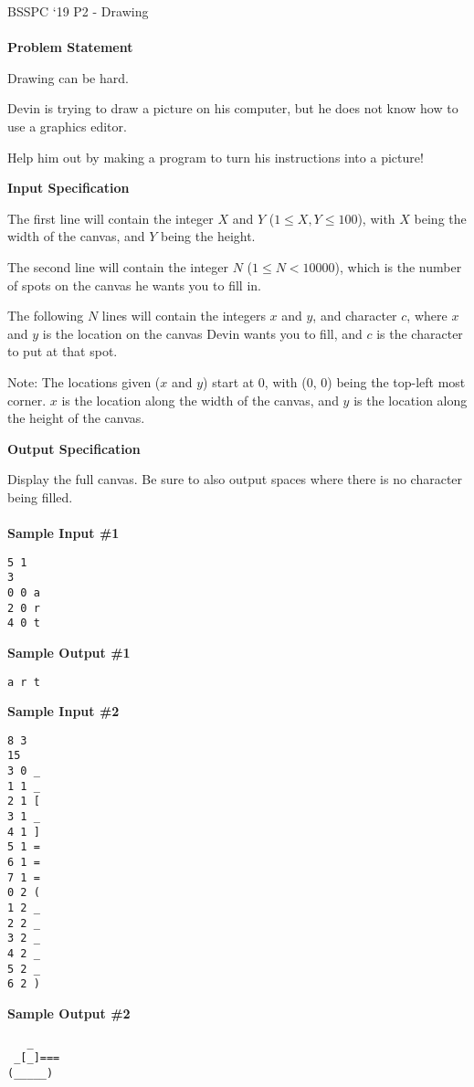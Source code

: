 \documentclass[]{article}
\begin{document}
{\Large BSSPC `19 P2 - Drawing}
\\\\
\textbf{\large Problem Statement}
\par
Drawing can be hard.
\par
Devin is trying to draw a picture on his computer, but he does not know how to use a graphics editor. 
\par
Help him out by making a program to turn his instructions into a picture!

\textbf{\large Input Specification}
\par
The first line will contain the integer $X$ and $Y$ ($1 \le X, Y \le 100$), with $X$ being the width of the canvas, and $Y$ being the height.
\par
The second line will contain the integer $N$ ($1 \le N < 10000$), which is the number of spots on the canvas he wants you to fill in.
\par
The following $N$ lines will contain the integers $x$ and $y$, and character $c$, where $x$ and $y$ is the location on the canvas Devin wants you to fill, and $c$ is the character to put at that spot.
\par
Note: The locations given ($x$ and $y$) start at 0, with (0, 0) being the top-left most corner. $x$ is the location along the width of the canvas, and $y$ is the location along the height of the canvas.

\textbf{\large Output Specification}
\par
Display the full canvas. Be sure to also output spaces where there is no character being filled.
\\\\
\textbf{\large Sample Input \#1}
\begin{verbatim}
5 1
3
0 0 a
2 0 r
4 0 t
\end{verbatim}

\textbf{\large Sample Output \#1}

\begin{verbatim}
a r t
\end{verbatim}

\textbf{\large Sample Input \#2}

\begin{verbatim}
8 3
15
3 0 _
1 1 _
2 1 [
3 1 _
4 1 ]
5 1 =
6 1 =
7 1 =
0 2 (
1 2 _
2 2 _
3 2 _
4 2 _
5 2 _
6 2 )
\end{verbatim}

\textbf{\large Sample Output \#2}

\begin{verbatim}
   _
 _[_]===
(_____) 
\end{verbatim}

\thispagestyle{empty}
\end{document}
